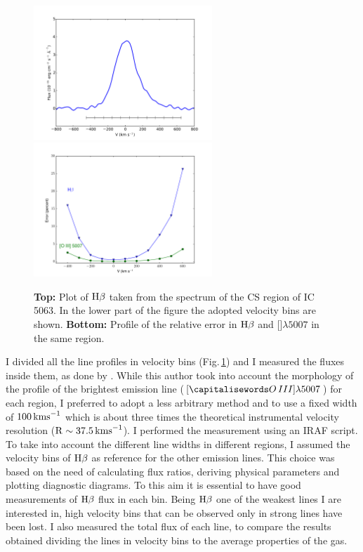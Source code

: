 \documentclass[../main.tex]{subfiles}
\begin{document}
\begin{figure}
\centering
\includegraphics[width=0.60\textwidth]{images/paper1/IC5063_bins.pdf} \\
\includegraphics[width=0.60\textwidth]{images/paper1/errors.pdf}
\caption[]{\textbf{Top:} Plot of $\Hb$ taken from the spectrum of the CS region of IC\,5063. In the lower part of the figure the adopted velocity bins are shown. \textbf{Bottom:} Profile of the relative error in $\Hb$ and []$\lambda5007$ in the same region.}
\label{fig:bins}
\end{figure}

I divided all the line profiles in velocity bins (Fig.\,\ref{fig:bins}) and I measured the fluxes inside them, as done by \citet{Ozaki09}.
While this author took into account the morphology of the profile of the brightest emission line ($[\ion{O}{III}]\lambda5007$) for each region, I preferred to adopt a less arbitrary method and to use a fixed width of $100\,\si{\kms}$ which is about three times the theoretical instrumental velocity resolution ($\rm R\sim 37.5\,\si{\kms}$).
I performed the measurement using an IRAF script. 
To take into account the different line widths in different regions, I assumed the velocity bins of $\Hb$ as reference for the other emission lines. 
This choice was based on the need of calculating flux ratios, deriving physical parameters and plotting diagnostic diagrams. 
To this aim it is essential to have good measurements of $\Hb$ flux in each bin. 
Being $\Hb$ one of the weakest lines I are interested in, high velocity bins that can be observed only in strong lines have been lost.
I also measured the total flux of each line, to compare the results obtained dividing the lines in velocity bins to the average properties of the gas.
\end{document}
